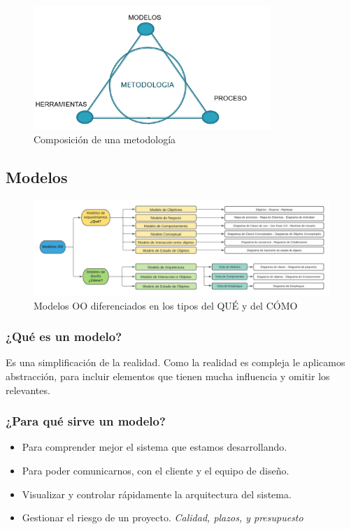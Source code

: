 \documentclass[titlepage,a4paper]{article}
\begin{document}
    \begin{figure}[!htb]
        \centering
        \includegraphics[width=0.8\textwidth]{Imagenes/Metodologias.png}
        \caption{Composición de una metodología}
    \end{figure}

\subsection{Modelos}


\begin{figure}[!htb]
    \centering
    \hspace*{-2.8cm}
    \includegraphics[width=1.3\textwidth]{Imagenes/ModelosOO.png}
    \caption{Modelos OO diferenciados en los tipos del QUÉ y del CÓMO}
\end{figure}

\subsubsection*{¿Qué es un modelo?}
Es una simplificación de la realidad. Como la realidad es compleja le aplicamos abstracción, para incluir elementos que tienen mucha influencia y omitir los relevantes.

\subsubsection*{¿Para qué sirve un modelo?}
    \begin{itemize}
        \item Para comprender mejor el sistema que estamos desarrollando.
        \item Para poder comunicarnos, con el cliente y el equipo de diseño.
        \item Visualizar y controlar rápidamente la arquitectura del sistema.
        \item Gestionar el riesgo de un proyecto. \textit{Calidad, plazos, y presupuesto}
    \end{itemize}
\end{document}
